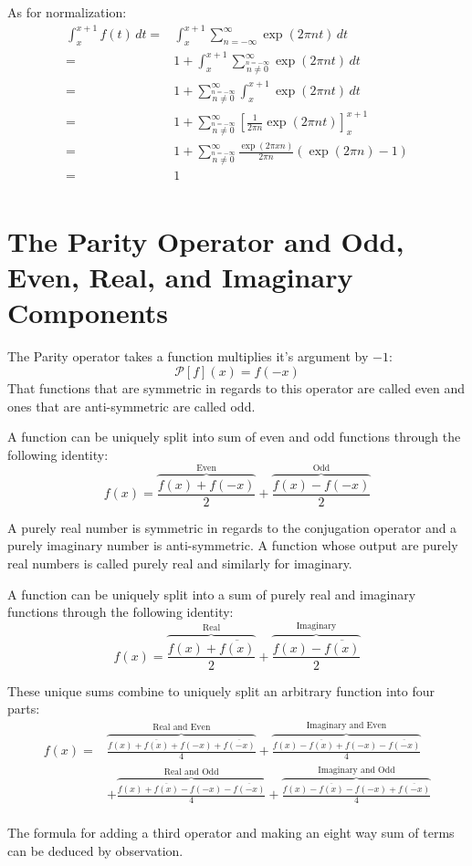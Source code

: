 \documentclass[12pt]{report}
\begin{document}
As for normalization:
\begin{equation*}
\begin{aligned}
\int_{x}^{x+1}f(t)\,dt =& \int_{x}^{x+1}\sum_{n=-\infty}^{\infty}\exp(2\pi n t)\,dt\\
=& 1+\int_{x}^{x+1}\sum_{\stackrel{n=-\infty}{n\neq 0}}^{\infty}\exp(2\pi n t)\,dt\\
=& 1+\sum_{\stackrel{n=-\infty}{n\neq 0}}^{\infty}\int_{x}^{x+1}\exp(2\pi n t)\,dt\\
=& 1+\sum_{\stackrel{n=-\infty}{n\neq 0}}^{\infty}\left[\frac{1}{2\pi n}\exp(2\pi n t)\right]_{x}^{x+1}\\
=& 1+\sum_{\stackrel{n=-\infty}{n\neq 0}}^{\infty}\frac{\exp(2\pi x n)}{2\pi n}(\exp(2\pi n)-1)\\
=& 1\\
\end{aligned}
\end{equation*}

\section{The Parity Operator and Odd, Even, Real, and Imaginary Components}
\label{appx:real-img-odd-even}
The Parity operator takes a function multiplies it's argument by $-1$:
\[\mathcal{P}[f](x) = f(-x)\]
That functions that are symmetric in regards to this operator are called even and ones that are anti-symmetric are called odd.

A function can be uniquely split into  sum of even and odd functions through the following identity:
\[ f(x) = \overbrace{\frac{f(x)+f(-x)}{2}}^\text{Even}+\overbrace{\frac{f(x)-f(-x)}{2}}^\text{Odd}\]

A purely real number is symmetric in regards to the conjugation operator and a purely imaginary number is anti-symmetric.
A function whose output are purely real numbers is called purely real and similarly for imaginary.

A function can be uniquely split into a sum of purely real and imaginary functions through the following identity:
\[ f(x) = \overbrace{\frac{f(x)+\overline{f(x)}}{2}}^\text{Real}+\overbrace{\frac{f(x)-\overline{f(x)}}{2}}^\text{Imaginary}\]

These unique sums combine to uniquely split an arbitrary function into four parts:
\begin{equation*}
\begin{aligned}
	 f(x) =& \overbrace{\frac{f(x)+\overline{f(x)}+f(-x) + \overline{f(-x)}}{4}}^\text{Real and Even}+\overbrace{\frac{f(x)-\overline{f(x)}+f(-x)-\overline{f(-x)}}{4}}^\text{Imaginary and Even} \\
	 &+ \overbrace{\frac{f(x)+\overline{f(x)}-f(-x) - \overline{f(-x)}}{4}}^\text{Real and Odd}+\overbrace{\frac{f(x)-\overline{f(x)}-f(-x)+\overline{f(-x)}}{4}}^\text{Imaginary and Odd}\\
\end{aligned}
\end{equation*}

The formula for adding a third operator and making an eight way sum of terms can be deduced by observation.
\end{document}
